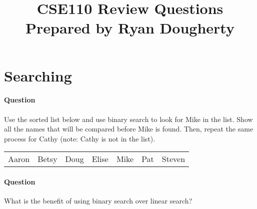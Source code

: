 \documentclass{article}
\date{}
\begin{document}
\title{\textbf{CSE110 Review Questions \\
Prepared by Ryan Dougherty}}
\maketitle

\section*{Searching}


\setcounter{question_num}{1}
\paragraph{Question }
Use the sorted list below and use binary search to look for Mike in the list. Show all the names that will be compared before Mike is found. Then, repeat the same process for Cathy (note: Cathy is not in the list).
\begin{table}[h]
\begin{tabular}{lllllll}
Aaron & Betsy & Doug & Elise & Mike & Pat & Steven
\end{tabular}
\end{table}

\addtocounter{question_num}{1}
\paragraph{Question }
What is the benefit of using binary search over linear search?
\end{document}
